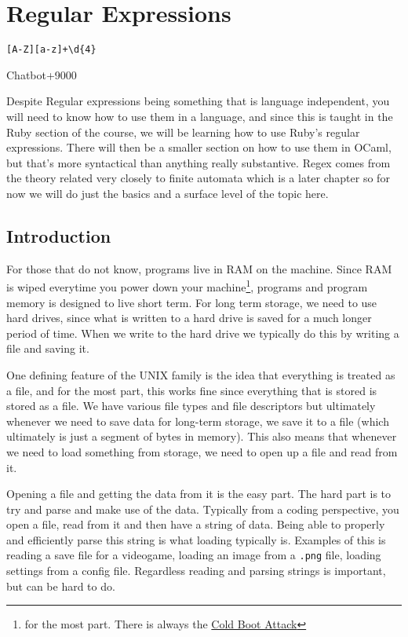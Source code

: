 \documentclass[main.tex]{subfiles}
\begin{document}
\chapter{Regular Expressions}
\epigraph{\texttt{[A-Z][a-z]+\textbackslash{}d\{4\}}}{Chatbot+9000}

Despite Regular expressions being something that is language independent, you will need to know how to use them in a language, and since this is taught in the Ruby section of the course, we will be learning how to use Ruby's regular expressions.
There will then be a smaller section on how to use them in OCaml, but that's more syntactical than anything really substantive. 
Regex comes from the theory related very closely to finite automata which is a later chapter so for now we will do just the basics and a surface level of the topic here. 

\section{Introduction}
For those that do not know, programs live in RAM on the machine. 
Since RAM is wiped everytime you power down your machine\footnote{for the most part. There is always the \href{https://en.wikipedia.org/wiki/Cold_boot_attack}{Cold Boot Attack}}, programs and program memory is designed to live short term. 
For long term storage, we need to use hard drives, since what is written to a hard drive is saved for a much longer period of time. 
When we write to the hard drive we typically do this by writing a file and saving it. 

One defining feature of the UNIX family is the idea that everything is treated as a file, and for the most part, this works fine since everything that is stored is stored as a file. 
We have various file types and file descriptors but ultimately whenever we need to save data for long-term storage, we save it to a file (which ultimately is just a segment of bytes in memory).
This also means that whenever we need to load something from storage, we need to open up a file and read from it.

Opening a file and getting the data from it is the easy part. 
The hard part is to try and parse and make use of the data. 
Typically from a coding perspective, you open a file, read from it and then have a string of data. 
Being able to properly and efficiently parse this string is what loading typically is. 
Examples of this is reading a save file for a videogame, loading an image from a \texttt{.png} file, loading settings from a config file. 
Regardless reading and parsing strings is important, but can be hard to do.
\end{document}
